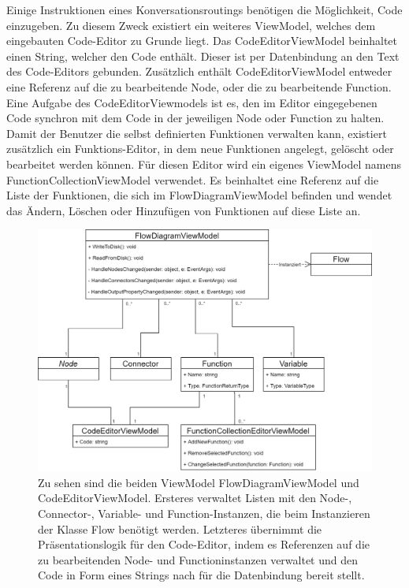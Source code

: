 \newline
Einige Instruktionen eines Konversationsroutings benötigen die Möglichkeit, Code einzugeben. Zu diesem Zweck existiert ein weiteres ViewModel, welches dem eingebauten Code-Editor zu Grunde liegt. Das CodeEditorViewModel beinhaltet einen String, welcher den Code enthält. Dieser ist per Datenbindung an den Text des Code-Editors gebunden. Zusätzlich enthält CodeEditorViewModel entweder eine Referenz auf die zu bearbeitende Node, oder die zu bearbeitende Function. Eine Aufgabe des CodeEditorViewmodels ist es, den im Editor eingegebenen Code synchron mit dem Code in der jeweiligen Node oder Function zu halten. 
\newline
Damit der Benutzer die selbst definierten Funktionen verwalten kann, existiert zusätzlich ein Funktions-Editor, in dem neue Funktionen angelegt, gelöscht oder bearbeitet werden können. Für diesen Editor wird ein eigenes ViewModel namens FunctionCollectionViewModel verwendet. Es beinhaltet eine Referenz auf die Liste der Funktionen, die sich im FlowDiagramViewModel befinden und wendet das Ändern, Löschen oder Hinzufügen von Funktionen auf diese Liste an.

\begin{figure} %
	\centering
		\includegraphics[width=\textwidth]{img/FlowDiagramViewModelUML.png}
	\caption[Klassenstruktur der ViewModelSchicht]{Zu sehen sind die beiden ViewModel FlowDiagramViewModel und CodeEditorViewModel. Ersteres verwaltet Listen mit den Node-, Connector-, Variable- und Function-Instanzen, die beim Instanzieren der Klasse Flow benötigt werden. Letzteres übernimmt die Präsentationslogik für den Code-Editor, indem es Referenzen auf die zu bearbeitenden Node- und Functioninstanzen verwaltet und den Code in Form eines Strings nach für die Datenbindung bereit stellt.}
	\label{fig:UML:FlowViewModel}
\end{figure}


